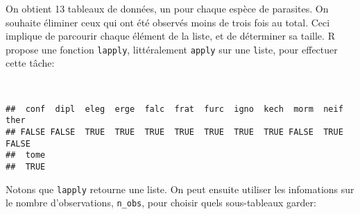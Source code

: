 \noindent On obtient 13 tableaux de données, un pour chaque espèce de parasites.
On souhaite éliminer ceux qui ont été observés moins de trois fois au total.
Ceci implique de parcourir chaque élément de la liste, et de déterminer sa taille.
R propose une fonction \texttt{lapply}, littéralement \texttt{apply} sur une \texttt{l}iste, pour effectuer cette tâche:

\begin{knitrout}
\color{fgcolor}\begin{kframe}
\begin{flushleft}
\ttfamily\noindent
{}\hlassignement{\usebox{\hlnormalsizeboxlessthan}-}{\ }\hlkeyword{(}\hlkeyword{(}\hlkeyword{,}{\ }\hlkeyword{)}\hlkeyword{)}\hspace*{\fill}\\
\hlstd{}\hlkeyword{\usebox{\hlnormalsizeboxgreaterthan}=}{\ }\mbox{}
\normalfont
\end{flushleft}
\begin{verbatim}
##  conf  dipl  eleg  erge  falc  frat  furc  igno  kech  morm  neif  ther 
## FALSE FALSE  TRUE  TRUE  TRUE  TRUE  TRUE  TRUE  TRUE FALSE  TRUE FALSE 
##  tome 
##  TRUE 
\end{verbatim}
\end{kframe}
\end{knitrout}


\noindent Notons que \texttt{lapply} retourne une liste.
On peut ensuite utiliser les infomations sur le nombre d'observations, \texttt{n\_obs}, pour choisir quels sous-tableaux garder: 

\begin{knitrout}
\color{fgcolor}\begin{kframe}
\begin{flushleft}
\ttfamily\noindent
{}\hlassignement{\usebox{\hlnormalsizeboxlessthan}-}{\ }\hlkeyword{[}\hlkeyword{\usebox{\hlnormalsizeboxgreaterthan}=}{\ }\hlkeyword{]}\mbox{}
\normalfont
\end{flushleft}
\end{kframe}
\end{knitrout}


